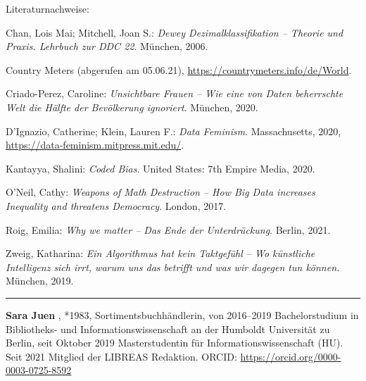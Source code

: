 \documentclass[a4paper,
fontsize=11pt,
oneside,
numbers=noperiodatend,
parskip=half-,
bibliography=totoc,
final
]{scrartcl}
\begin{document}
Literaturnachweise:

Chan, Lois Mai; Mitchell, Joan S.: \emph{Dewey Dezimalklassifikation --
Theorie und Praxis. Lehrbuch zur DDC 22}. München, 2006.

Country Meters (abgerufen am 05.06.21),
\url{https://countrymeters.info/de/World}.

Criado-Perez, Caroline: \emph{Unsichtbare Frauen -- Wie eine von Daten
beherrschte Welt die Hälfte der Bevölkerung ignoriert}. München, 2020.

D'Ignazio, Catherine; Klein, Lauren F.: \emph{Data Feminism}.
Massachusetts, 2020, \linebreak \url{https://data-feminism.mitpress.mit.edu/}.

Kantayya, Shalini: \emph{Coded Bias}. United States: 7th Empire Media,
2020.

O'Neil, Cathy: \emph{Weapons of Math Destruction -- How Big Data
increases Inequality and threatens Democracy}. London, 2017.

Roig, Emilia: \emph{Why we matter -- Das Ende der Unterdrückung}.
Berlin, 2021.

Zweig, Katharina: \emph{Ein Algorithmus hat kein Taktgefühl -- Wo
künstliche Intelligenz sich irrt, warum uns das betrifft und was wir
dagegen tun können.} München, 2019.

\begin{center}\rule{0.5\linewidth}{0.5pt}\end{center}

\textbf{Sara Juen} , *1983, Sortimentsbuchhändlerin, von 2016--2019
Bachelorstudium in Bibliotheks- und Informationswissenschaft an der
Humboldt Universität zu Berlin, seit Oktober 2019 Masterstudentin für
Informationswissenschaft (HU). Seit 2021 Mitglied der LIBREAS Redaktion.
ORCID: \url{https://orcid.org/0000-0003-0725-8592}
\end{document}
